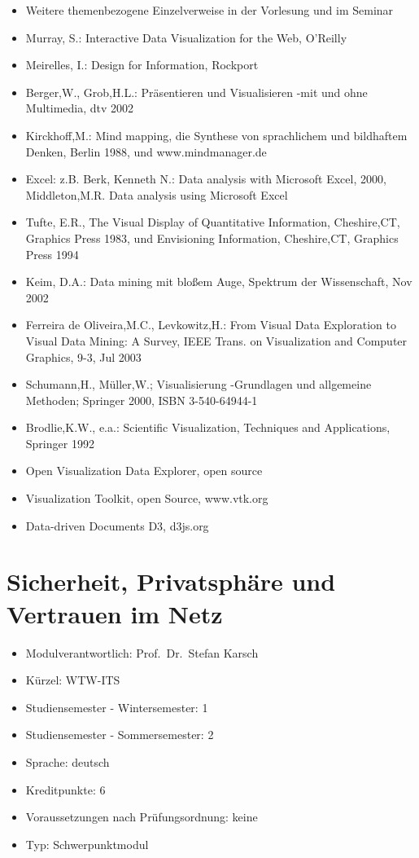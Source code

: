 \begin{itemize}
\item
  Weitere themenbezogene Einzelverweise in der Vorlesung und im Seminar
\item
  Murray, S.: Interactive Data Visualization for the Web, O'Reilly
\item
  Meirelles, I.: Design for Information, Rockport
\item
  Berger,W., Grob,H.L.: Präsentieren und Visualisieren -mit und ohne
  Multimedia, dtv 2002
\item
  Kirckhoff,M.: Mind mapping, die Synthese von sprachlichem und
  bildhaftem Denken, Berlin 1988, und www.mindmanager.de
\item
  Excel: z.B. Berk, Kenneth N.: Data analysis with Microsoft Excel,
  2000, Middleton,M.R. Data analysis using Microsoft Excel
\item
  Tufte, E.R., The Visual Display of Quantitative Information,
  Cheshire,CT, Graphics Press 1983, und Envisioning Information,
  Cheshire,CT, Graphics Press 1994
\item
  Keim, D.A.: Data mining mit bloßem Auge, Spektrum der Wissenschaft,
  Nov 2002
\item
  Ferreira de Oliveira,M.C., Levkowitz,H.: From Visual Data Exploration
  to Visual Data Mining: A Survey, IEEE Trans. on Visualization and
  Computer Graphics, 9-3, Jul 2003
\item
  Schumann,H., Müller,W.; Visualisierung -Grundlagen und allgemeine
  Methoden; Springer 2000, ISBN 3-540-64944-1
\item
  Brodlie,K.W., e.a.: Scientific Visualization, Techniques and
  Applications, Springer 1992
\item
  Open Visualization Data Explorer, open source
\item
  Visualization Toolkit, open Source, www.vtk.org
\item
  Data-driven Documents D3, d3js.org
\end{itemize}

\chapter{Sicherheit, Privatsphäre und Vertrauen im
Netz}\label{sicherheit-privatsphuxe4re-und-vertrauen-im-netz}

\begin{itemize}
\tightlist
\item
  Modulverantwortlich: Prof.~Dr.~Stefan Karsch
\item
  Kürzel: WTW-ITS
\item
  Studiensemester - Wintersemester: 1
\item
  Studiensemester - Sommersemester: 2
\item
  Sprache: deutsch
\item
  Kreditpunkte: 6
\item
  Voraussetzungen nach Prüfungsordnung: keine
\item
  Typ: Schwerpunktmodul
\end{itemize}

